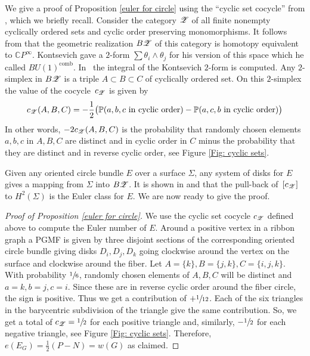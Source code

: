 \documentclass[11pt]{article}
\numberwithin{equation}{section}\providecommand{\dpl}{\displaystyle}
\theoremstyle{plain}
\theoremstyle{definition}
\begin{document}
We give a proof of Proposition \ref{euler for circle} using the ``cyclic set cocycle'' from \cite{I04}, which we briefly recall. Consider the category $\mathscr{Z}$ of all finite nonempty cyclically ordered sets and cyclic order preserving monomorphisms. It follows from \cite{K92} that the geometric realization $B\mathscr{Z}$ of this category is homotopy equivalent to $\mathbb CP^\infty$. Kontsevich gave a $2$-form $\sum \theta_i\wedge \theta_j$ for his version of this space which he called $BU(1)^\mathrm{comb}$. In~\cite{I04} the integral of the Kontsevich $2$-form is computed. Any $2$\nobreakdash-simplex in $B\mathscr{Z}$ is a triple $A\subset B\subset C$ of cyclically ordered set. On this $2$\nobreakdash-simplex the value of the cocycle~$c_{\mathscr{Z}}$ is given by
\[
c_{\mathscr{Z}}(A,B,C)= -\frac12 \big(\mathbb P(a,b,c\text{ in cyclic order})-\mathbb P(a,c,b\text{ in cyclic order})\big)
\]
In other words, $-2c_{\mathscr{Z}}(A,B,C)$ is the probability that randomly chosen elements $a,b,c$ in $A,B,C$ are distinct and in cyclic order in $C$ minus the probability that they are distinct and in reverse cyclic order, see Figure \ref{Fig: cyclic sets}.

Given any oriented circle bundle $E$ over a surface $\Sigma$, any system of disks for $E$ gives a mapping from $\Sigma$ into $B\mathscr{Z}$. It is shown in \cite{I04} and \cite{J89} that the pull-back of~$[c_{\mathscr{Z}}]$ to $ H^2(\Sigma)$ is the Euler class for $E$. We are now ready to give the proof.

\begin{proof}[Proof of Proposition \ref{euler for circle}]
We use the cyclic set cocycle $c_{\mathscr{Z}}$ defined above to compute the Euler number of $E$.
Around a positive vertex in a ribbon graph a PGMF is given by three disjoint sections of the corresponding oriented circle bundle giving disks $D_i,D_j,D_k$ going clockwise around the vertex on the surface and clockwise around the fiber. Let $A=\{k\}, B=\{j,k\}, C=\{i,j,k\}$. With probability $\sfrac16$, randomly chosen elements of $A,B,C$ will be distinct and $a=k,b=j,c=i$. Since these are in reverse cyclic order around the fiber circle, the sign is positive. Thus we get a contribution of $+\sfrac1{12}$. Each of the six triangles in the barycentric subdivision of the triangle give the same contribution. So, we get a total of $c_{\mathscr{Z}}=\sfrac12$ for each positive triangle and, similarly, $-\sfrac12$ for each negative triangle, see Figure \ref{Fig: cyclic sets}. Therefore, $e(E_G)=\frac12(P-N)=w(G)$ as claimed.
\end{proof}
\end{document}
